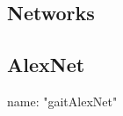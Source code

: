 \documentclass[11pt]{article} %
\begin{document}
\begin{appendices}
\section{Networks}
\label{sec:networkCodes}

\subsection{AlexNet}
name: "gaitAlexNet"
%  
%
%

\end{appendices}
\end{document}
